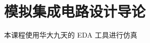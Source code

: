 \documentclass[cn,11pt,chinese,black,simple]{../elegantbook}
\begin{document}
\fi 
\def\chapname{02design}

\chapter{模拟集成电路设计导论}

本课程使用华大九天的 EDA 工具进行仿真

\let\chapname\undefined
\ifx\mainclass\undefined
\end{document}
